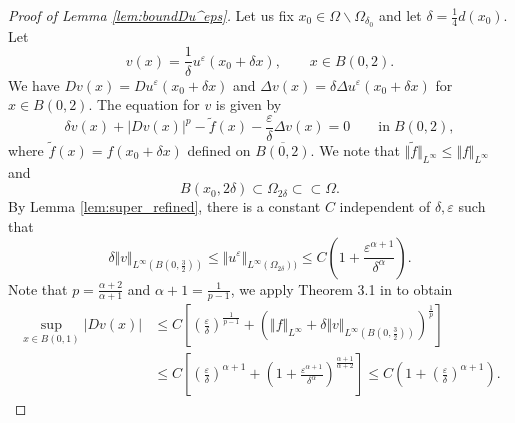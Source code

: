\documentclass[12pt,reqno]{amsart}
\numberwithin{figure}{section}
\theoremstyle{plain}
\theoremstyle{remark}
\numberwithin{equation}{section}
\begin{document}
\begin{proof}[Proof of Lemma \ref{lem:boundDu^eps}] %
Let us fix $x_0 \in \Omega\backslash \Omega_{\delta_0}$ and let $\delta = \frac{1}{4}d(x_0)$. Let 
\begin{equation*}
    v(x) = \frac{1}{\delta}u^\varepsilon(x_0+\delta x), \qquad x\in B(0,2).   
\end{equation*}
We have $Dv(x) = Du^\varepsilon(x_0+\delta x)$ and $\Delta v(x) = \delta \Delta u^\varepsilon(x_0+\delta x)$ for $x\in B(0,2)$. The equation for $v$ is given by
\begin{equation*}
    \delta v(x) + |Dv(x)|^p - \tilde{f}(x) - \frac{\varepsilon}{\delta}\Delta v(x) = 0 \qquad\text{in}\;B(0,2),
\end{equation*}
where $\tilde{f}(x) = f(x_0+\delta x)$ defined on $\overline{B(0,2)}$. We note that $\Vert \tilde{f}\Vert_{L^\infty}\leq \Vert f\Vert_{L^\infty}$ and 
\begin{equation*}
    B(x_0,2\delta)\subset \Omega_{2\delta}\subset\subset\Omega.
\end{equation*}
By Lemma \ref{lem:super_refined}, there is a constant $C$ independent of $\delta,\varepsilon$ such that 
\begin{equation*}
     \delta\Vert v\Vert_{L^\infty\left(B\left(0,\frac{3}{2}\right)\right)} \leq \Vert u^\varepsilon\Vert_{L^\infty(\Omega_{2\delta}))} \leq C\left(1 + \frac{\varepsilon^{\alpha+1}}{\delta^\alpha}\right).
\end{equation*}
Note that $p = \frac{\alpha+2}{\alpha+1}$ and $\alpha+1 = \frac{1}{p-1}$, we apply Theorem 3.1 in \cite{Armstrong2015a} to obtain 
\begin{equation*}
\begin{split}
    \sup_{x\in B(0,1)}|Dv(x)| &\leq C\left[\left(\frac{\varepsilon}{\delta}\right)^{\frac{1}{p-1}} + \left(\Vert f\Vert_{L^\infty}+\delta \Vert v\Vert_{L^\infty\left(B\left(0,\frac{3}{2}\right)\right)}\right)^{\frac{1}{p}}\right] \\
    &\leq C\left[\left(\frac{\varepsilon}{\delta}\right)^{\alpha+1} + \left(1+\frac{\varepsilon^{\alpha+1}}{\delta^\alpha}\right)^{\frac{\alpha+1}{\alpha+2}}\right]\leq C \left(1+\left(\frac{\varepsilon}{\delta}\right)^{\alpha+1}\right).
\end{split}

\end{equation*}
\end{proof}
\end{document}
